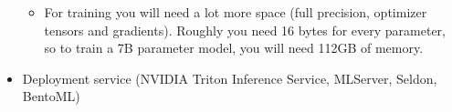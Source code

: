 \begin{itemize}
\begin{itemize}
			\item For training you will need a lot more space (\eg full precision, optimizer tensors and gradients). Roughly you need 16 bytes for every parameter, so to train a 7B parameter model, you will need 112GB of memory.  
		\end{itemize}
	\item Deployment service (\eg NVIDIA Triton Inference Service, MLServer, Seldon, BentoML) 
\end{itemize}






